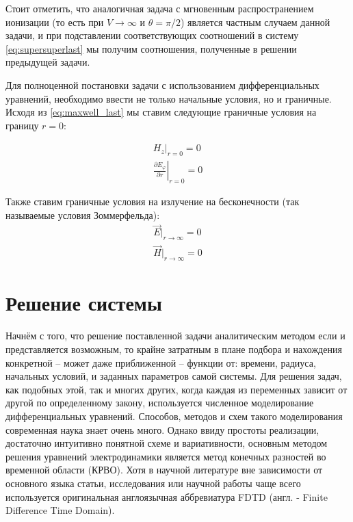 \documentclass[a4paper]{article}
\begin{document}
Стоит отметить, что аналогичная задача с мгновенным распространением ионизации (то есть при $V\rightarrow\infty$ и $\theta=\pi/2$) является частным случаем данной задачи, и при подставлении соответствующих соотношений в систему \eqref{eq:supersuperlast} мы получим соотношения, полученные в решении предыдущей задачи.










Для полноценной постановки задачи с использованием дифференциальных уравнений, необходимо ввести не только начальные условия, но и граничные. Исходя из \eqref{eq:maxwell_last} мы ставим следующие граничные условия на границу $r=0$:

\begin{eqnarray}
	H_{z}|_{r=0}=0 \\
	\left.\frac{\partial E_{\varphi}}{\partial r}\right|_{r=0}=0
\end{eqnarray}

Также ставим граничные условия на излучение на бесконечности (так называемые условия Зоммерфельда):
\begin{eqnarray}
	\vec{E}|_{r\rightarrow\infty}=0 \\
	\vec{H}|_{r\rightarrow\infty}=0
\end{eqnarray}


\newpage
\section{Решение системы}

Начнём с того, что решение поставленной задачи аналитическим методом если и представляется возможным, то крайне затратным в плане подбора и нахождения конкретной -- может даже приближенной -- функции от: времени, радиуса, начальных условий, и заданных параметров самой системы. Для решения задач, как подобных этой, так и многих других, когда каждая из переменных зависит от другой по определенному закону, используется численное моделирование дифференциальных уравнений. Способов, методов и схем такого моделирования современная наука знает очень много. Однако ввиду простоты реализации, достаточно интуитивно понятной схеме и вариативности, основным методом решения уравнений электродинамики является метод конечных разностей во временной области (КРВО). Хотя в научной литературе вне зависимости от основного языка статьи, исследования или научной работы чаще всего используется оригинальная англоязычная аббревиатура {FDTD} (англ. - Finite Difference Time Domain).
\end{document}
